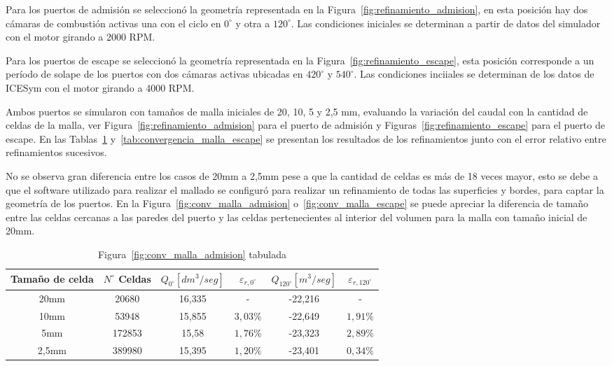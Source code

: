 Para los puertos de admisión se seleccionó la geometría representada en la
Figura~\ref{fig:refinamiento_admision}, en esta posición hay dos cámaras de
combustión activas una con el ciclo en $0^{\circ}$ y otra a $120^{\circ}$.
%
Las condiciones iniciales se determinan a partir de datos del simulador con el
motor girando a 2000 RPM.

Para los puertos de escape se seleccionó la geometría representada en la
Figura~\ref{fig:refinamiento_escape}, esta posición corresponde a un período de
solape de los puertos con dos cámaras activas ubicadas en $420^{\circ}$ y
$540^{\circ}$.
%
Las condiciones inciiales se determinan de los datos de ICESym con el motor
girando a 4000 RPM.


Ambos puertos se simularon con tamaños de malla iniciales de 20, 10, 5 y 2,5 mm,
evaluando la variación del caudal con la cantidad de celdas de la malla, ver
Figura~\ref{fig:refinamiento_admision} para el puerto de admisión y
Figuras~\ref{fig:refinamiento_escape} para el puerto de escape.
%
En las Tablas~\ref{tab:convergencia_malla_admision}
y~\ref{tab:convergencia_malla_escape} se presentan los resultados de los
refinamientos junto con el error relativo entre refinamientos sucesivos.

No se observa gran diferencia entre los casos de 20mm a 2,5mm pese a que la
cantidad de celdas es más de 18 veces mayor, esto se debe a que el software
utilizado para realizar el mallado se configuró para realizar un refinamiento de
todas las superficies y bordes, para captar la geometría de los puertos.
%
En la Figura~\ref{fig:conv_malla_admision} o~\ref{fig:conv_malla_escape} se
puede apreciar la diferencia de tamaño entre las celdas cercanas a las paredes
del puerto y las celdas pertenecientes al interior del volumen para la malla con
tamaño inicial de 20mm.

\begin{table}
  \centering
  \begin{tabular}{cccccc}\toprule
    Tamaño de celda & $N^{\circ}$ Celdas & $Q_{0^{\circ}} [dm^{3}/seg]$ & $\varepsilon_{r,0^{\circ}}$ & $Q_{120^{\circ}} [m^{3}/seg]$ & $\varepsilon_{r,120^{\circ}}$ \\ \midrule
    20mm  & 20680  & 16,335 & -        & -22,216 & - \\
    10mm  & 53948  & 15,855 & $3,03\%$ & -22,649 & $1,91\%$ \\
    5mm   & 172853 & 15,58  & $1,76\%$ & -23,323 & $2,89\%$ \\
    2,5mm & 389980 & 15,395 & $1,20\%$ & -23,401 & $0,34\%$ \\ \bottomrule
  \end{tabular}
  \caption{Figura~\ref{fig:conv_malla_admision} tabulada}\label{tab:convergencia_malla_admision}
\end{table}

